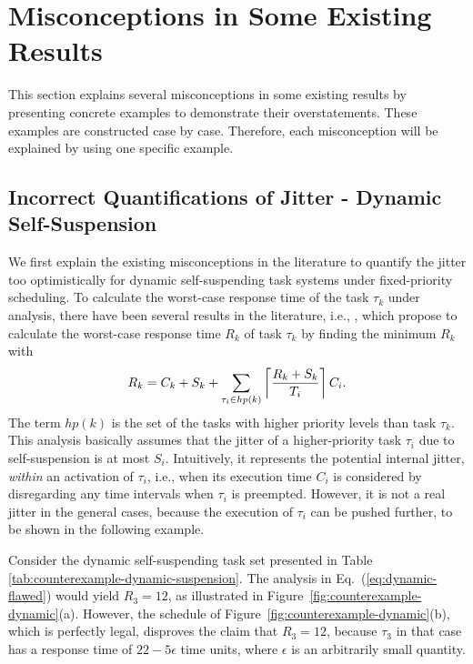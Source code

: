 
\section{Misconceptions in Some Existing Results}
\label{sec:misconceptions}

This section explains several misconceptions in some existing results by presenting concrete examples to demonstrate their overstatements. These examples are constructed case by case. Therefore, each misconception will be explained by using one specific example. 

\subsection{Incorrect Quantifications of Jitter - Dynamic Self-Suspension}
\label{sec:wrong-jitter-dynamic}

We first explain the existing misconceptions in the literature to quantify the jitter too optimistically for dynamic self-suspending task systems under fixed-priority scheduling. To calculate the worst-case response time of the task $\tau_k$ under analysis, there have been several results in the literature, i.e., \cite{ECRTS-AudsleyB04,RTAS-AudsleyB04,RTCSA-KimCPKH95,MingLiRTCSA1994},  which propose to calculate the worst-case response time $R_k$ of task $\tau_k$ by finding the minimum $R_k$ with
\begin{equation}
R_k = C_k+ S_k+\sum_{\tau_i \in hp(k)}\left\lceil{\frac{R_k+S_k}{T_i}}\right\rceil C_i.
\label{eq:dynamic-flawed}
\end{equation}
The term $hp(k)$ is the set of the tasks with higher priority levels than task $\tau_k$. This analysis basically assumes that the jitter of a higher-priority task $\tau_i$ due to self-suspension is at most $S_i$.  Intuitively, it represents the potential internal jitter, \textit{within} an activation of $\tau_i$, i.e., when its execution time $C_i$ is considered by disregarding any time intervals when $\tau_i$ is preempted. 
However, it is not a real jitter in the general cases, because the execution of $\tau_i$ can be pushed further, to be shown in the following example.


Consider the dynamic self-suspending task set presented in Table \ref{tab:counterexample-dynamic-suspension}. 
The analysis in Eq.~(\ref{eq:dynamic-flawed}) would yield $R_3=12$, as illustrated in 
Figure~\ref{fig:counterexample-dynamic}(a). However, the schedule of Figure~\ref{fig:counterexample-dynamic}(b), which is perfectly legal, 
disproves the claim that $R_3=12$, because $\tau_3$ in that case has a response time of $22-5\epsilon$ time units, 
where $\epsilon$ is an arbitrarily small quantity. 

